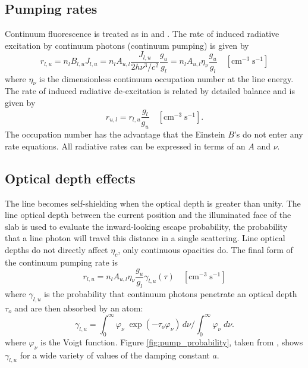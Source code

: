 \subsection{Pumping rates}

Continuum fluorescence is treated as in \citet{Ferland1988} and \citet{Ferland1992}.
The rate of induced radiative excitation by continuum photons
(continuum pumping) is given by
\begin{equation}
{r_{l,u}} = {n_l}{B_{l,u}}{J_{l,u}} =
{n_l}{A_{u,l}}\frac{{{J_{l,u}}}}{{2h{\nu ^3}/{c^2}}}\frac{{{g_u}}}{{{g_l}}}
= {n_l}{A_{u,l}}{\eta _\nu }\frac{{{g_u}}}{{{g_l}}}
\quad [\mathrm{cm}^{-3}\;\mathrm{s}^{-1}]
\end{equation}
where $\eta_\nu$ is the dimensionless continuum occupation number
at the line energy.
The rate of induced radiative de-excitation is related by
detailed balance and is given by
\begin{equation}
{r_{u,l}} = {r_{l,u}}\frac{{{g_l}}}{{{g_u}}}
\quad [\mathrm{cm}^{-3} \;\mathrm{s}^{-1}].
\end{equation}
The occupation number has the advantage that the Einstein $B$'s
do not enter any rate equations.
All radiative rates can be expressed in terms of an
$A$ and $\nu$.

\subsection{Optical depth effects}

The line becomes self-shielding when the optical depth is greater than
unity.
The line optical depth between the current position and the
illuminated face of the slab is used to evaluate the inward-looking escape
probability, the probability that a line photon will travel this distance
in a single scattering.
Line optical depths do not directly affect $\eta_c$,
only continuous opacities do.
The final form of the continuum pumping rate is
\begin{equation}
{r_{l,u}} = {n_l}{A_{u,l}}{\eta _\nu }\frac{{{g_u}}}{{{g_l}}}{\gamma
_{l,u}}\left( \tau  \right)
\quad [\mathrm{cm}^{-3} \;\mathrm{s}^{-1}]
\end{equation}
where $\gamma_{l,u}$ is the probability that continuum photons
penetrate an optical
depth $\tau_o$ and are then absorbed by an atom:
\begin{equation}
{\gamma _{l,u}} = \int_0^\infty  {{\varphi _\nu }\;\exp \left( { - {\tau
_o}{\varphi _\nu }} \right)\,d\nu } /\int_0^\infty  {{\varphi _\nu }\;d\nu
} .
\end{equation}
where $\varphi_\nu$ is the Voigt function.
Figure \ref{fig:pump_probability},
taken from \citet{Ferland1992}, shows
$\gamma_{l,u}$ for a wide variety of values of the damping constant $a$.

